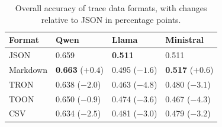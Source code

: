 \begin{table}[t]
\centering
\caption{Overall accuracy of trace data formats, with changes relative to JSON in percentage points.}
\label{tab:rq1_accuracy}
\begin{tabularx}{\columnwidth}{lXXX}
\toprule
Format & Qwen & Llama & Ministral \\
\midrule
JSON & 0.659 & \textbf{0.511} & 0.511 \\
Markdown & \textbf{0.663} ($+0.4$) & 0.495 ($-1.6$) & \textbf{0.517} ($+0.6$) \\
TRON & 0.638 ($-2.0$) & 0.463 ($-4.8$) & 0.480 ($-3.1$) \\
TOON & 0.650 ($-0.9$) & 0.474 ($-3.6$) & 0.467 ($-4.3$) \\
CSV & 0.634 ($-2.5$) & 0.481 ($-3.0$) & 0.479 ($-3.2$) \\
\bottomrule
\end{tabularx}
\end{table}
